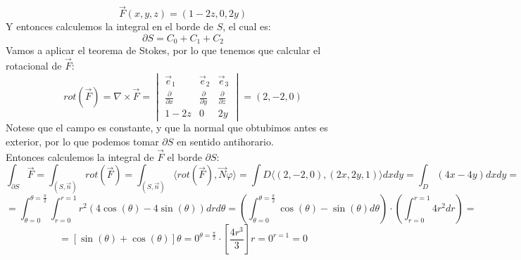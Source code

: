 {    $$ \vec{F}(x,y,z) = (1-2z,0,2y)$$
    Y entonces calculemos la integral en el borde de $S$, el cual es:
    $$ \partial S = C_0 + C_1 + C_2$$
    Vamos a aplicar el teorema de Stokes, por lo que tenemos que calcular el rotacional de $\vec{F}$:
    $$ rot(\vec{F}) = \nabla \times \vec{F} = \begin{vmatrix}
        \vec{e}_1 & \vec{e}_2 & \vec{e}_3 \\
        \frac{\partial}{\partial x} & \frac{\partial}{\partial y} & \frac{\partial}{\partial z} \\
        1 - 2z & 0 & 2y
    \end{vmatrix} = \left( 2, -2, 0 \right)$$
    Notese que el campo es constante, y que la normal que obtubimos antes es exterior, por lo que podemos tomar $\partial S$ en sentido antihorario.\\
    Entonces calculemos la integral de $\vec{F}$ el borde $\partial S$:
    $$ \int_{\partial S} \vec{F} = \int_{(S, \vec{n})} rot(\vec{F}) = \int_{(S, \vec{n})} \langle rot(\vec{F}), \vec{N}\varphi \rangle = \int{D} \langle (2, -2, 0), (2x, 2y, 1) \rangle dx dy = \int_{D} (4x - 4y) dx dy=$$
    $$= \int_{\theta = 0}^{\theta = \frac{\pi}{2}} \int_{r=0}^{r=1} r^2 (4 \cos(\theta) - 4 \sin(\theta)) dr d\theta = \left( \int_{\theta = 0}^{\theta = \frac{\pi}{2}} \cos(\theta) - \sin(\theta) d\theta \right) \cdot \left( \int_{r=0}^{r=1} 4r^2 dr \right) =$$
    $$= \left[ \sin(\theta) + \cos(\theta) \right]{\theta = 0}^{\theta = \frac{\pi}{2}} \cdot \left[ \frac{4r^3}{3} \right]{r=0}^{r=1} = 0$$
}

